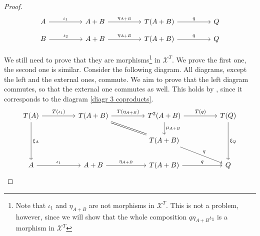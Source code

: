 \begin{subbox}{}
\begin{proof}
        \begin{minipage}{\textwidth}
        \[
\begin{tikzcd}
A \arrow[rr, "\iota_1"] &  & A+B \arrow[rr, "\eta_{A+B}"] &  & T(A+B) \arrow[rr, "q"] &  & Q
\end{tikzcd}
\]
\[
\begin{tikzcd}
B \arrow[rr, "\iota_2"] &  & A+B \arrow[rr, "\eta_{A+B}"] &  & T(A+B) \arrow[rr, "q"] &  & Q
\end{tikzcd}
\]
\end{minipage}
        We still need to prove that they are morphisms\footnote{Note that $\iota_1$ and $\eta_{A+B}$ are not morphisms in $\mathcal{X}^T$. This is not a problem, however, since we will show that the whole composition $q\eta_{A+B}\iota_1$ is a morphism in $\mathcal{X}^T$} in $\mathcal{X}^T$. We prove the first one, the second one is similar. Consider the following diagram. All diagrams, except the left and the external ones, commute. We aim to prove that the left diagram commutes, so that the external one commutes as well. This holds by , since it corresponds to the diagram \eqref{diagr 3 coproducts}.
        \[
\begin{tikzcd}
T(A) \arrow[dd, "\xi_A"] \arrow[rr, "T(\iota_1)"] &  & T(A+B) \arrow[rr, "T(\eta_{A+B})"] \arrow[rrd, equal] &  & T^2(A+B) \arrow[d, "\mu_{A+B}"] \arrow[rr, "T(q)"] &  & T(Q) \arrow[dd, "\xi_Q"] \\
                                                  &  &                                                               &  & T(A+B) \arrow[rrd, "q"]                            &  &                          \\
A \arrow[rr, "\iota_1"]                           &  & A+B \arrow[rr, "\eta_{A+B}"]                                  &  & T(A+B) \arrow[rr, "q"]                             &  & Q                       
\end{tikzcd}
        \]


\end{proof}
\end{subbox}

